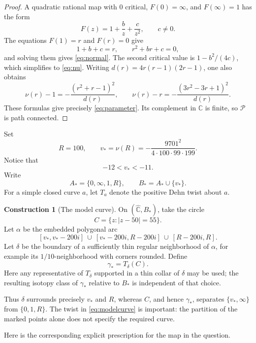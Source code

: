 \documentclass[11pt]{article}
\newcommand{\C}{\mathbb C}
\newcommand{\Sphere}{\widehat{\mathbb C}}
\newcommand{\Par}{\mathcal P}
\theoremstyle{definition}
\newtheorem{construction}[theorem]{Construction}
\theoremstyle{remark}
\begin{document}
\begin{proof}
A quadratic rational map with $0$ critical, $F(0)=\infty$, and
$F(\infty)=1$ has the form
\[
F(z)=1+\frac b z+\frac c{z^2},\qquad c\ne0.
\]
The equations $F(1)=r$ and $F(r)=0$ give
\[
1+b+c=r,\qquad r^2+br+c=0,
\]
and solving them gives \eqref{eq:normal}.  The second critical value is
$1-b^2/(4c)$, which simplifies to \eqref{eq:nu}.
Writing $d(r)=4r(r-1)(2r-1)$, one also obtains
\[
\nu(r)-1=-\frac{(r^2+r-1)^2}{d(r)},\qquad
\nu(r)-r=-\frac{(3r^2-3r+1)^2}{d(r)}.
\]
These formulas give precisely \eqref{eq:parameter}.  Its complement
in $\C$ is finite, so $\Par$ is path connected.
\end{proof}

Set
\[
R=100,\qquad
v_*=\nu(R)=-\frac{9701^2}{4\cdot100\cdot99\cdot199}.
\]
Notice that
\begin{equation}\label{eq:vbound}
-12<v_*<-11.
\end{equation}
Write
\[
A_*=\{0,\infty,1,R\},\qquad B_*=A_*\cup\{v_*\}.
\]
For a simple closed curve $a$, let $T_a$ denote the positive Dehn twist
about $a$.

\begin{construction}[The model curve]\label{con:model}
On $(\Sphere,B_*)$, take the circle
\[
C=\{z:|z-50|=55\}.
\]
Let $\alpha$ be the embedded polygonal arc
\[
[v_*,v_*-200i]\ \cup\
[v_*-200i,R-200i]\ \cup\
[R-200i,R].
\]
Let $\delta$ be the boundary of a sufficiently thin regular
neighborhood of $\alpha$, for example its $1/10$-neighborhood with
corners rounded.  Define
\begin{equation}\label{eq:modelcurve}
\boxed{\ \gamma_*=T_\delta(C).\ }
\end{equation}
Here any representative of $T_\delta$ supported in a thin collar of
$\delta$ may be used; the resulting isotopy class of $\gamma_*$
relative to $B_*$ is independent of that choice.
\end{construction}

Thus $\delta$ surrounds precisely $v_*$ and $R$, whereas $C$, and hence
$\gamma_*$, separates $\{v_*,\infty\}$ from $\{0,1,R\}$.
The twist in \eqref{eq:modelcurve} is important: the partition of the
marked points alone does not specify the required curve.

Here is the corresponding explicit prescription for the map in the
question.
\end{document}
